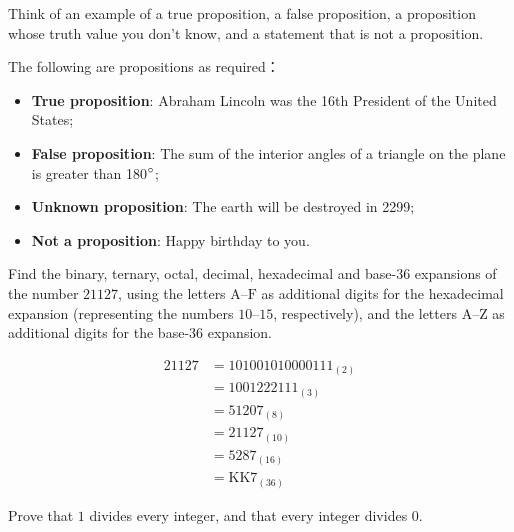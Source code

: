
\begin{exercise}
Think of an example of a true proposition, a false proposition, a proposition whose truth value you don't know, and a statement that is not a proposition.
\end{exercise}

\begin{solution}
The following are propositions as required：
\begin{itemize}
\item \textbf{True proposition}: Abraham Lincoln was the 16th President of the United States;
\item \textbf{False proposition}: The sum of the interior angles of a triangle on the plane is greater than 180$\degree$;
\item \textbf{Unknown proposition}: The earth will be destroyed in 2299;
\item \textbf{Not a proposition}: Happy birthday to you.
\end{itemize}
\end{solution}


\begin{exercise}
Find the binary, ternary, octal, decimal, hexadecimal and base-$36$ expansions of the number $21127$, using the letters $\mathrm{A}$--$\mathrm{F}$ as additional digits for the hexadecimal expansion (representing the numbers $10$--$15$, respectively), and the letters $\mathrm{A}$--$\mathrm{Z}$ as additional digits for the base-$36$ expansion.
\end{exercise}

\begin{solution}
\begin{align*}
21127 &= 101001010000111_{(2)} \\
&= 1001222111_{(3)} \\
&= 51207_{(8)}\\
&= 21127_{(10)}\\
&= 5287_{(16)}\\
&= \mathrm{KK}7_{(36)}
\end{align*}
\end{solution}


\begin{exercise}
\label{exOneDividesEveryIntegerDividesZero}
Prove that $1$ divides every integer, and that every integer divides $0$.
\end{exercise}

